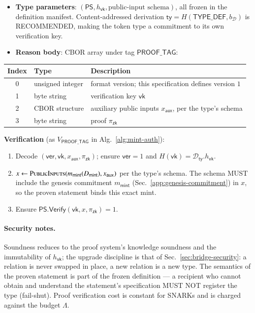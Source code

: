 \begin{itemize}
	\item \textbf{Type parameters}: $(\mathsf{PS}, h_\mathsf{vk}, \text{public-input schema})$, all frozen in the definition manifest. Content-addressed derivation $\mathsf{ty} = H(\mathsf{TYPE\_DEF}, b_\mathcal{D})$ is RECOMMENDED, making the token type a commitment to its own verification key.
	\item \textbf{Reason body}: CBOR array under tag $\mathsf{PROOF\_TAG}$:
\end{itemize}

\begin{longtable}{clp{8.6cm}}
\textbf{Index} & \textbf{Type} & \textbf{Description} \\
\hline
0 & unsigned integer & format version; this specification defines version $1$ \\
1 & byte string & verification key $\mathsf{vk}$ \\
2 & CBOR structure & auxiliary public inputs $x_\mathsf{aux}$, per the type's schema \\
3 & byte string & proof $\pi_\mathsf{zk}$ \\
\end{longtable}

\textbf{Verification} (as $V_{\mathsf{PROOF\_TAG}}$ in Alg.~\ref{alg:mint-auth}):
\begin{enumerate}
	\item Decode $(\mathsf{ver}, \mathsf{vk}, x_\mathsf{aux}, \pi_\mathsf{zk})$; ensure $\mathsf{ver} = 1$ and $H(\mathsf{vk}) = \mathcal{D}_\mathsf{ty}.h_\mathsf{vk}$.
	\item $x \gets \Call{PublicInputs}{m_\mathsf{mint}(D_\mathsf{mint}), x_\mathsf{aux}}$ per the type's schema. The schema MUST include the genesis commitment $m_\mathsf{mint}$ (Sec.~\ref{app:genesis-commitment}) in $x$, so the proven statement binds this exact mint.
	\item Ensure $\mathsf{PS}.\mathsf{Verify}(\mathsf{vk}, x, \pi_\mathsf{zk}) = 1$.
\end{enumerate}

\paragraph{Security notes.} Soundness reduces to the proof system's knowledge soundness and the immutability of $h_\mathsf{vk}$; the upgrade discipline is that of Sec.~\ref{sec:bridge-security}: a relation is never swapped in place, a new relation is a new type. The semantics of the proven statement is part of the frozen definition --- a recipient who cannot obtain and understand the statement's specification MUST NOT register the type (fail-shut). Proof verification cost is constant for SNARKs and is charged against the budget $\Lambda$.


